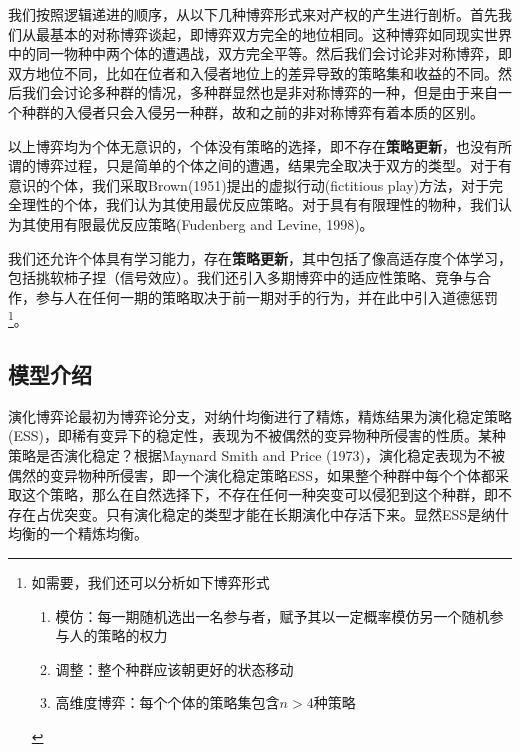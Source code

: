 \documentclass[lang=cn,12pt,a4paper]{elegantpaper}
\begin{document}
我们按照逻辑递进的顺序，从以下几种博弈形式来对产权的产生进行剖析。首先我们从最基本的对称博弈谈起，即博弈双方完全的地位相同。这种博弈如同现实世界中的同一物种中两个体的遭遇战，双方完全平等。然后我们会讨论非对称博弈，即双方地位不同，比如在位者和入侵者地位上的差异导致的策略集和收益的不同。然后我们会讨论多种群的情况，多种群显然也是非对称博弈的一种，但是由于来自一个种群的入侵者只会入侵另一种群，故和之前的非对称博弈有着本质的区别。

以上博弈均为个体无意识的，个体没有策略的选择，即不存在\textbf{策略更新}，也没有所谓的博弈过程，只是简单的个体之间的遭遇，结果完全取决于双方的类型。对于有意识的个体，我们采取Brown(1951)提出的虚拟行动(fictitious play)方法，对于完全理性的个体，我们认为其使用最优反应策略。对于具有有限理性的物种，我们认为其使用有限最优反应策略(Fudenberg and Levine, 1998)。

我们还允许个体具有学习能力，存在\textbf{策略更新}，其中包括了像高适存度个体学习，包括挑软柿子捏（信号效应）。我们还引入多期博弈中的适应性策略、竞争与合作，参与人在任何一期的策略取决于前一期对手的行为，并在此中引入道德惩罚\footnote{如需要，我们还可以分析如下博弈形式
\begin{enumerate}
\item 模仿：每一期随机选出一名参与者，赋予其以一定概率模仿另一个随机参与人的策略的权力
\item 调整：整个种群应该朝更好的状态移动
\item 高维度博弈：每个个体的策略集包含$n>4$种策略
\end{enumerate}}。




\subsection{模型介绍}

演化博弈论最初为博弈论分支，对纳什均衡进行了精炼，精炼结果为演化稳定策略(ESS)，即稀有变异下的稳定性，表现为不被偶然的变异物种所侵害的性质。某种策略是否演化稳定？根据Maynard Smith and Price (1973)，演化稳定表现为不被偶然的变异物种所侵害，即一个演化稳定策略ESS，如果整个种群中每个个体都采取这个策略，那么在自然选择下，不存在任何一种突变可以侵犯到这个种群，即不存在占优突变。只有演化稳定的类型才能在长期演化中存活下来。显然ESS是纳什均衡的一个精炼均衡。
\end{document}
